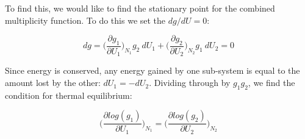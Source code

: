 To find this, we would like to find the stationary point for the combined multiplicity function. To do this we set the $dg/dU = 0$:

\begin{equation}
dg = \bigg(\frac{\partial g_1}{\partial U_1}\bigg)_{N_1} g_2~dU_1 +
     \bigg(\frac{\partial g_2}{\partial U_2}\bigg)_{N_2} g_1~dU_2 = 0  
\label{eq:maxg}
\end{equation}

Since energy is conserved, any energy gained by one sub-system is equal
to the amount lost by the other: $dU_1 = -dU_2$. Dividing through by
$g_1 g_2$, we find the condition for thermal equilibrium:

\begin{equation}
\bigg(\frac{\partial log(g_1)}{\partial U_1}\bigg)_{N_1} = 
\bigg(\frac{\partial log(g_2)}{\partial U_2}\bigg)_{N_2}
\label{eq:maxmicro}
\end{equation}

